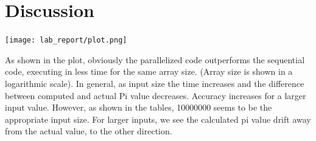 \documentclass[10pt,a4paper]{article} %
\begin{document}
\section{Discussion}

\texttt{[image: lab\_report/plot.png]}

As shown in the plot, obviously the parallelized code outperforms the sequential code, executing in less time for the same array size. 
(Array size is shown in a logarithmic scale).
In general, as input size the time increases and the difference between  computed and actual Pi value decreases. Accuracy increases for a larger input value. However, as shown in the tables, 10000000 seems to be the appropriate input size. For larger inputs, we see the calculated pi value drift away from the actual value, to the other direction.


\end{document}
